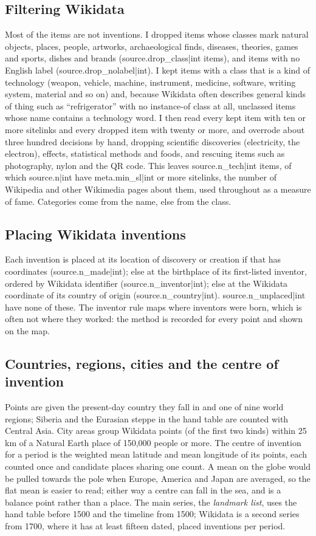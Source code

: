 \documentclass[11pt,a4paper]{article}
\begin{document}
\subsection{Filtering Wikidata}
Most of the items are not inventions. I dropped items whose classes mark natural objects, places, people, artworks, archaeological finds, diseases, theories, games and sports, dishes and brands ({{source.drop_class|int}} items), and items with no English label ({{source.drop_nolabel|int}}). I kept items with a class that is a kind of technology (weapon, vehicle, machine, instrument, medicine, software, writing system, material and so on) and, because Wikidata often describes general kinds of thing such as ``refrigerator'' with no instance-of class at all, unclassed items whose name contains a technology word. I then read every kept item with ten or more sitelinks and every dropped item with twenty or more, and overrode about three hundred decisions by hand, dropping scientific discoveries (electricity, the electron), effects, statistical methods and foods, and rescuing items such as photography, nylon and the QR code. This leaves {{source.n_tech|int}} items, of which {{source.n|int}} have {{meta.min_sl|int}} or more sitelinks, the number of Wikipedia and other Wikimedia pages about them, used throughout as a measure of fame. Categories come from the name, else from the class.

\subsection{Placing Wikidata inventions}
Each invention is placed at its location of discovery or creation if that has coordinates ({{source.n_made|int}}); else at the birthplace of its first-listed inventor, ordered by Wikidata identifier ({{source.n_inventor|int}}); else at the Wikidata coordinate of its country of origin ({{source.n_country|int}}). {{source.n_unplaced|int}} have none of these. The inventor rule maps where inventors were born, which is often not where they worked: the method is recorded for every point and shown on the map.

\subsection{Countries, regions, cities and the centre of invention}
Points are given the present-day country they fall in and one of nine world regions; Siberia and the Eurasian steppe in the hand table are counted with Central Asia. City areas group Wikidata points (of the first two kinds) within 25 km of a Natural Earth place of 150,000 people or more. The centre of invention for a period is the weighted mean latitude and mean longitude of its points, each counted once and candidate places sharing one count. A mean on the globe would be pulled towards the pole when Europe, America and Japan are averaged, so the flat mean is easier to read; either way a centre can fall in the sea, and is a balance point rather than a place. The main series, the \emph{landmark list}, uses the hand table before 1500 and the timeline from 1500; Wikidata is a second series from 1700, where it has at least fifteen dated, placed inventions per period.
\end{document}
